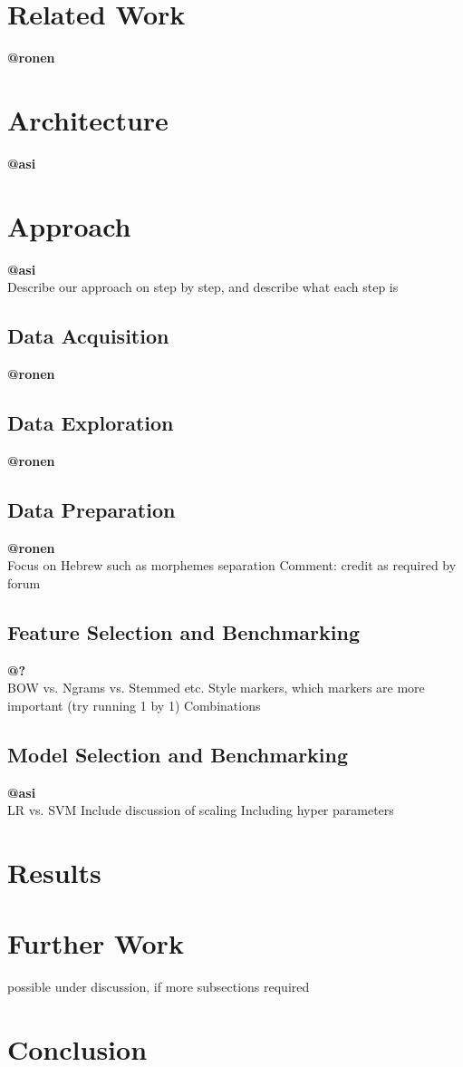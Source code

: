 \documentclass[a4paper,twocolumn]{article}
\begin{document}
\section{Related Work}
\label{Related Work} 
\textbf{@ronen}\\
\section{Architecture}
\label{Architecture}
\textbf{@asi}\\
\section{Approach}
\label{Approach}
\textbf{@asi}\\
Describe our approach on step by step, and describe what each step is
\subsection{Data Acquisition}
\textbf{@ronen}\\
\subsection{Data Exploration}
\textbf{@ronen}\\
\subsection{Data Preparation}
\textbf{@ronen}\\

Focus on Hebrew such as morphemes separation
Comment: credit as required by forum
\subsection{Feature Selection and Benchmarking}
\textbf{@?}\\
BOW vs. Ngrams vs. Stemmed etc.
Style markers, which markers are more important (try running 1 by 1)
Combinations

\subsection{Model Selection and Benchmarking}
\textbf{@asi}\\
LR vs. SVM
Include discussion of scaling
Including hyper parameters
\section{Results}
\label{Results}
\section{Further Work}
\label{Further Work}
possible under discussion, if more subsections required
\section{Conclusion}
\label{Conclusion}
\end{document}
